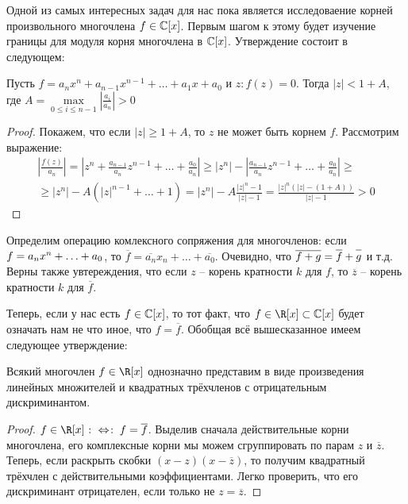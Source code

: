 Одной из самых интересных задач для нас пока является исследоваение корней произвольного многочлена $f\in\mathbb{C}[x]$. Первым шагом к этому будет изучение границы для модуля корня многочлена в $\mathbb{C}[x]$. Утверждение состоит в следующем:

\begin{theorem}
  Пусть $f=a_nx^n+a_{n-1}x^{n-1}+\dots+a_1x+a_0$ и $z\colon f(z)=0$. Тогда $|z|<1+A$, где $A=\max\limits_{0\le i\le n-1}\left|\frac{a_i}{a_n}\right|>0$
\end{theorem}
\begin{proof}
  Покажем, что если $|z|\ge1+A$, то $z$ не может быть корнем $f$. Рассмотрим выражение:
  \begin{multline*}  
    \left|\frac{f(z)}{a_n}\right|=\left|z^n+\frac{a_{n-1}}{a_n}z^{n-1}+\dots+\frac{a_0}{a_n}\right|\ge|z^n|-\left|\frac{a_{n-1}}{a_n}z^{n-1}+\dots+\frac{a_0}{a_n}\right|\ge\\ \ge
    |z^n|-A\left(|z|^{n-1}+\dots+1\right)=|z^n|-A\frac{|z|^n-1}{|z|-1}=\frac{|z|^n(|z|-(1+A))}{|z|-1}>0
  \end{multline*}
\end{proof}

Определим операцию комлексного сопряжения для многочленов: если $f\bw=a_nx^n\bw+\dots\bw+a_0$, то $\overline{f}=\overline{a_n}x_n+\dots+\overline{a_0}$. Очевидно, что $\overline{f+g}=\overline{\mathstrut f}+\overline{\mathstrut g}$ и т.д. Верны также увтереждения, что если $z$ -- корень кратности $k$ для $f$, то $\overline{z}$ -- корень кратности $k$ для $\overline{f}$.

Теперь, если у нас есть $f\in\mathbb{C}[x]$, то тот факт, что $f\in\R[x]\subset\Cbb[x]$ будет означать нам не что иное, что $f=\overline{f}$. Обобщая всё вышесказанное имеем следующее утверждение:

\begin{theorem}
  Всякий многочлен $f\in\R[x]$ однозначно представим в виде произведения линейных множителей и квадратных трёхчленов с отрицательным дискриминантом.
\end{theorem}
\begin{proof}
  $f\in\R[x]\lra f=\overline{f}$. Выделив сначала действительные корни многочлена, его комплексные корни мы можем сгруппировать по парам $z$ и $\overline{z}$. Теперь, если раскрыть скобки $(x-z)(x-\overline{z})$, то получим квадратный трёхчлен с действительными коэффициентами. Легко проверить, что его дискриминант отрицателен, если только не $z=\overline{z}$.
\end{proof}

